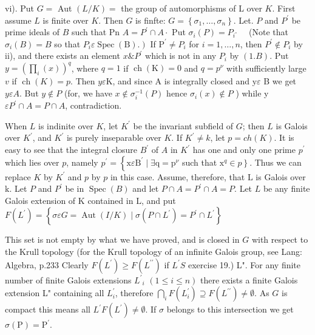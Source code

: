 vi). Put $G=$ Aut $(L / K)=$ the group of automorphisms of L over $K$. First assume $L$ is finite over $K$. Then $G$ is finfte: $G=\left\{\sigma_{1}, \ldots, \sigma_{n}\right\}$. Let. $P$ and $P^{\prime}$ be prime ideals of $B$ such that Pn $A=P^{\prime} \cap A \cdot$ Put $\sigma_{i}(P)=P_{i^{\circ}} \quad$ (Note that $\sigma_{i}(B)=B$ so that $\left.P_{i} \varepsilon \operatorname{Spec}(\mathrm{B}) .\right)$ If $\mathrm{P}^{\prime} \neq P_{i}$ for $i=1, \ldots, n$, then $P^{\prime} \notin P_{i}$ by ii), and there exists an element $x \& P^{\prime}$ which is not in any $P_{i}$ by $(1 . B)$. Put $y=\left(\prod_{i}(x)\right)^{q}$, where $q=1$ if $\operatorname{ch}(\mathrm{K})=0$ and $q=p^{\nu}$ with sufficiently large $v$ if $\operatorname{ch}(K)=p$. Then $y \varepsilon \mathrm{K}$, and since A is integrally closed and $\mathrm{y} \varepsilon$ B we get $y \varepsilon A$. But $y \notin P$ (for, we have $x \notin \sigma_{i}^{-1}(P)$ hence $\sigma_{i}(x) \notin P$ ) while y $\varepsilon P^{\prime} \cap A=P \cap A$, contradiction.

When $L$ is indinite over $K$, let $K^{\prime}$ be the invariant subfield of $G$; then $L$ is Galois over $K^{\prime}$, and $K^{\prime}$ is purely inseparable over $K$. If $K^{\prime} \neq k$, let $p=c h(K)$. It is easy to see that the integral closure $B^{\prime}$ of $A$ in $K^{\prime}$ has one and only one prime $p^{\prime}$ which lies over $p$, namely $p^{\prime}=\left\{\mathrm{x} \varepsilon \mathrm{B}^{\prime} \mid \exists \mathrm{q}=\mathrm{p}^{\nu}\right.$ such that $\left.\mathrm{x}^{q} \in p\right\}$. Thus we can replace $K$ by $K^{\prime}$ and $p$ by $p$ in this case. Assume, therefore, that $\mathrm{L}$ is Galois over $\mathrm{k}$. Let $P$ and $P^{\prime}$ be in $\operatorname{Spec}(B)$ and let $P \cap A=P^{\prime} \cap A=P$. Let $L$ be any finite Galois extension of $\mathrm{K}$ contained in $\mathrm{L}$, and put $F\left(L^{\prime}\right)=\left\{\sigma \varepsilon G=\operatorname{Aut}(I / K) \mid \sigma\left(P \cap L^{\prime}\right)=P^{\prime} \cap L^{\prime}\right\}$

This set is not empty by what we have proved, and is closed in $G$ with respect to the Krull topology (for the Krull topology of an infinite Galois group, see Lang: Algebra, p.233 Clearly $F\left(L^{\prime}\right) \geq F\left(L^{\prime \prime}\right)$ if $L^{\prime} S$ exercise 19.) L". For any finite number of finite Galois extensions $L^{\prime}{ }_{i}$ $(1 \leqslant i \leqslant n)$ there exists a finite Galois extension L" containing all $L_{i}^{\prime}$, therefore $\bigcap_{i} F\left(L_{i}^{\prime}\right) \supseteq F\left(L^{\prime \prime}\right) \neq \emptyset$. As $G$ is compact this means all $L^{\prime} F\left(L^{\prime}\right) \neq \emptyset$. If $\sigma$ belongs to this intersection we get $\sigma(\mathrm{P})=\mathrm{P}^{\prime}$.

